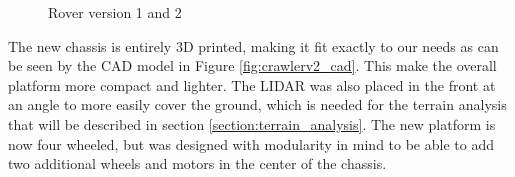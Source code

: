 \documentclass[11pt]{article}
\begin{document}
        \begin{figure}[h!]
            \centering 
            \caption{Rover version 1 and 2}
            \label{fig:rover_comparison}
        \end{figure}

        The new chassis is entirely 3D printed, making it fit exactly to our needs as can be seen by the CAD model in Figure \ref{fig:crawlerv2_cad}. This make the overall platform more compact and lighter. The LIDAR was also placed in the front at an angle to more easily cover the ground, which is needed for the terrain analysis that will be described in section \ref{section:terrain_analysis}. The new platform is now four wheeled, but was designed with modularity in mind to be able to add two additional wheels and motors in the center of the chassis.
\end{document}
